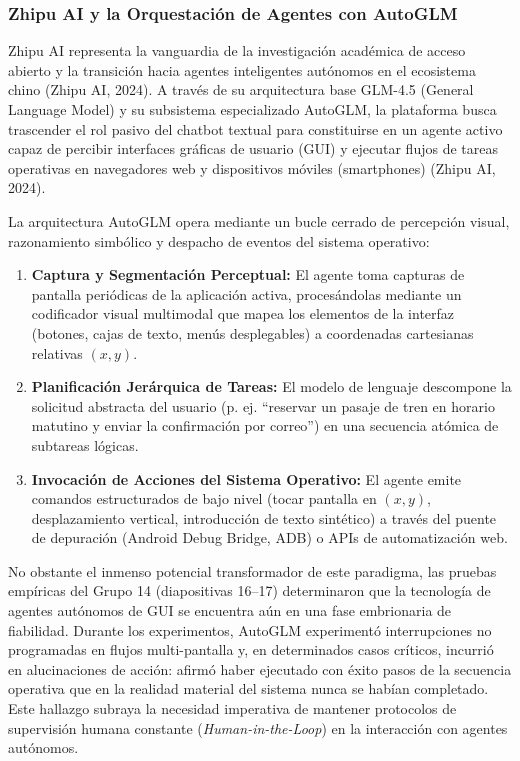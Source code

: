 \subsubsection{Zhipu AI y la Orquestación de Agentes con AutoGLM}

Zhipu AI representa la vanguardia de la investigación académica de acceso abierto y la transición hacia agentes inteligentes autónomos en el ecosistema chino (Zhipu AI, 2024). A través de su arquitectura base GLM-4.5 (General Language Model) y su subsistema especializado AutoGLM, la plataforma busca trascender el rol pasivo del chatbot textual para constituirse en un agente activo capaz de percibir interfaces gráficas de usuario (GUI) y ejecutar flujos de tareas operativas en navegadores web y dispositivos móviles (smartphones) (Zhipu AI, 2024).

La arquitectura AutoGLM opera mediante un bucle cerrado de percepción visual, razonamiento simbólico y despacho de eventos del sistema operativo:
\begin{enumerate}[label=\arabic*., leftmargin=2em]
    \item \textbf{Captura y Segmentación Perceptual:} El agente toma capturas de pantalla periódicas de la aplicación activa, procesándolas mediante un codificador visual multimodal que mapea los elementos de la interfaz (botones, cajas de texto, menús desplegables) a coordenadas cartesianas relativas $(x, y)$.
    \item \textbf{Planificación Jerárquica de Tareas:} El modelo de lenguaje descompone la solicitud abstracta del usuario (p. ej. ``reservar un pasaje de tren en horario matutino y enviar la confirmación por correo'') en una secuencia atómica de subtareas lógicas.
    \item \textbf{Invocación de Acciones del Sistema Operativo:} El agente emite comandos estructurados de bajo nivel (tocar pantalla en $(x, y)$, desplazamiento vertical, introducción de texto sintético) a través del puente de depuración (Android Debug Bridge, ADB) o APIs de automatización web.
\end{enumerate}

No obstante el inmenso potencial transformador de este paradigma, las pruebas empíricas del Grupo 14 (diapositivas 16--17) determinaron que la tecnología de agentes autónomos de GUI se encuentra aún en una fase embrionaria de fiabilidad. Durante los experimentos, AutoGLM experimentó interrupciones no programadas en flujos multi-pantalla y, en determinados casos críticos, incurrió en alucinaciones de acción: afirmó haber ejecutado con éxito pasos de la secuencia operativa que en la realidad material del sistema nunca se habían completado. Este hallazgo subraya la necesidad imperativa de mantener protocolos de supervisión humana constante (\textit{Human-in-the-Loop}) en la interacción con agentes autónomos.

